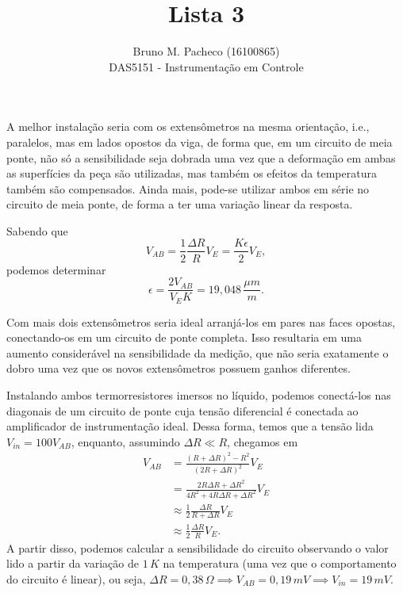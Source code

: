 \documentclass[a4paper]{report}
\begin{document}
 
\title{Lista 3}
\author{Bruno M. Pacheco (16100865)\\
DAS5151 - Instrumentação em Controle}
 
\maketitle
 


A melhor instalação seria com os extensômetros na mesma orientação, i.e., paralelos, mas em lados opostos da viga, de forma que, em um circuito de meia ponte, não só a sensibilidade seja dobrada uma vez que a deformação em ambas as superfícies da peça são utilizadas, mas também os efeitos da temperatura também são compensados. Ainda mais, pode-se utilizar ambos em série no circuito de meia ponte, de forma a ter uma variação linear da resposta.


Sabendo que \[
    V_{AB} = \frac{1}{2}\frac{\Delta R}{R} V_E = \frac{K \epsilon}{2} V_E
,\] podemos determinar \[
\epsilon = \frac{2 V_{AB}}{V_E K} = 19,048\,\frac{\mu m}{m}
.\] 


Com mais dois extensômetros seria ideal arranjá-los em pares nas faces opostas, conectando-os em um circuito de ponte completa. Isso resultaria em uma aumento considerável na sensibilidade da medição, que não seria exatamente o dobro uma vez que os novos extensômetros possuem ganhos diferentes.


Instalando ambos termorresistores imersos no líquido, podemos conectá-los nas diagonais de um circuito de ponte cuja tensão diferencial é conectada ao amplificador de instrumentação ideal. Dessa forma, temos que a tensão lida $V_{in} = 100 V_{AB}$, enquanto, assumindo $\Delta R \ll R$, chegamos em
\begin{align*}
    V_{AB} &= \frac{\left( R+\Delta R \right)^2 - R^2}{\left( 2R + \Delta R \right)^2 } V_E \\
    &= \frac{2R\Delta R + \Delta R^2}{4R^2 + 4R\Delta R + \Delta R^2} V_E \\
    &\approx \frac{1}{2}\frac{\Delta R}{R + \Delta R}V_E \\
    &\approx \frac{1}{2}\frac{\Delta R}{R} V_E
.\end{align*}
A partir disso, podemos calcular a sensibilidade do circuito observando o valor lido a partir da variação de $1\,K$ na temperatura (uma vez que o comportamento do circuito é linear), ou seja, $\Delta R = 0,38\,\Omega \implies V_{AB} = 0,19\,mV \implies V_{in} = 19\,mV$.
\end{document}
